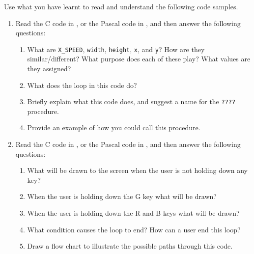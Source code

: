 Use what you have learnt to read and understand the following code samples.
\begin{enumerate}
  \item Read the C code in , or the Pascal code in , and then answer the following questions:
  \begin{enumerate}
    \item What are \texttt{X\_SPEED}, \texttt{width}, \texttt{height}, \texttt{x}, and \texttt{y}? How are they similar/different? What purpose does each of these play? What values are they assigned?
    \item What does the loop in this code do?
    \item Briefly explain what this code does, and suggest a name for the \texttt{????} procedure.
    \item Provide an example of how you could call this procedure.
  \end{enumerate}
  
  \begin{figure}[h]
  \end{figure}
  \begin{figure}[h]
  \end{figure}
  
  \item Read the C code in , or the Pascal code in , and then answer the following questions:
  \begin{enumerate}
    \item What will be drawn to the screen when the user is not holding down any key?
    \item When the user is holding down the G key what will be drawn?
    \item When the user is holding down the R and B keys what will be drawn?
    \item What condition causes the loop to end? How can a user end this loop?
    \item Draw a flow chart to illustrate the possible paths through this code.
  \end{enumerate}
  \begin{figure}[h]
  \end{figure}
  \begin{figure}[h]
  \end{figure}
  \clearpage
  

\end{enumerate}

